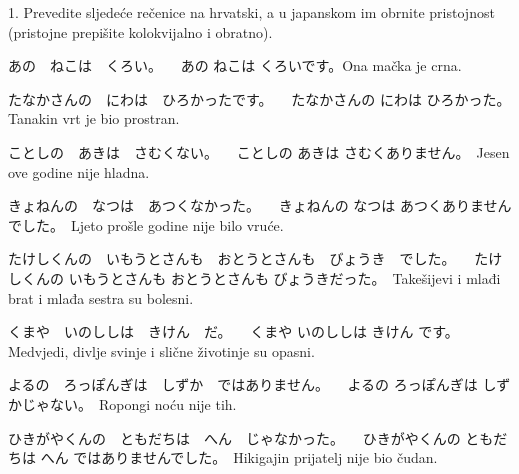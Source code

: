 
\author{Katja Kržišnik}

	\kaisetsu
	
	\begin{mondai}{1. Prevedite sljedeće rečenice na hrvatski, a u japanskom im obrnite pristojnost (pristojne prepišite kolokvijalno i obratno).}
		\item あの　ねこは　くろい。 \newline　あの ねこは くろいです。Ona mačka je crna.　
		\item たなかさんの　にわは　ひろかったです。 \newline　たなかさんの にわは ひろかった。　Tanakin vrt je bio prostran.　
		\item ことしの　あきは　さむくない。 \newline　ことしの あきは さむくありません。　Jesen ove godine nije hladna.
		\item きょねんの　なつは　あつくなかった。 \newline　きょねんの なつは あつくありませんでした。　Ljeto prošle godine nije bilo vruće.　
		\item たけしくんの　いもうとさんも　おとうとさんも　びょうき　でした。 \newline　たけしくんの いもうとさんも おとうとさんも びょうきだった。　Takešijevi i mlađi brat i mlađa sestra su bolesni.
		\item くまや　いのししは　きけん　だ。 \newline　くまや いのししは きけん です。　Medvjedi, divlje svinje i slične životinje su opasni.
		\item よるの　ろっぽんぎは　しずか　ではありません。 \newline　よるの ろっぽんぎは しずかじゃない。　Ropongi noću nije tih. 
		\item ひきがやくんの　ともだちは　へん　じゃなかった。 \newline　ひきがやくんの ともだちは へん ではありませんでした。　Hikigajin prijatelj nije bio čudan.
	\end{mondai}
	
	\begin{kaitou}[Lv. 1]
	\end{kaitou}

